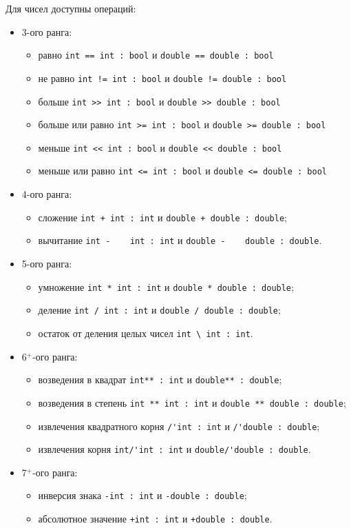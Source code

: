 \documentclass[a4paper, 14pt]{extarticle}
\newenvironment{icItems}
	{ \begin{itemize} [noitemsep,nolistsep] }
	{ \end{itemize} }
\begin{document}
Для чисел доступны операций:
\begin{icItems}
	\item
		3-ого ранга:
		\begin{icItems}
			\item
				равно \lstinline`int == int : bool` и \lstinline`double == double : bool`
			\item
				не равно \lstinline`int != int : bool` и \lstinline`double != double : bool`
			\item
				больше \lstinline`int >> int : bool` и \lstinline`double >> double : bool`
			\item
				больше или равно \lstinline`int >= int : bool` и \lstinline`double >= double : bool`
			\item
				меньше \lstinline`int << int : bool` и \lstinline`double << double : bool`
			\item
				меньше или равно \lstinline`int <= int : bool` и \lstinline`double <= double : bool`
		\end{icItems}
	\item
		4-ого ранга:
		\begin{icItems}
			\item
				сложение \lstinline`int + int : int` и \lstinline`double + double : double`;
			\item
				вычитание \lstinline`int -    int : int` и \lstinline`double -    double : double`.
		\end{icItems}
	\item
		5-ого ранга:
		\begin{icItems}
			\item
				умножение \lstinline`int * int : int` и \lstinline`double * double : double`;
			\item
				деление \lstinline`int / int : int` и \lstinline`double / double : double`;
			\item
				остаток от деления целых чисел \lstinline`int \ int : int`.
		\end{icItems}
	\item
		6$^+$-ого ранга:
		\begin{icItems}
			\item
				возведения в квадрат \lstinline`int** : int` и \lstinline`double** : double`;
			\item
				возведения в степень \lstinline`int ** int : int` и \lstinline`double ** double : double`;
			\item
				извлечения квадратного корня \lstinline`/'int : int` и \lstinline`/'double : double`;
			\item
				извлечения корня \lstinline`int/'int : int` и \lstinline`double/'double : double`.
		\end{icItems}
	\item
		7$^+$-ого ранга:
		\begin{icItems}
			\item
				инверсия знака \lstinline`-int : int` и \lstinline`-double : double`;
			\item
				абсолютное значение \lstinline`+int : int` и \lstinline`+double : double`.
		\end{icItems}
\end{icItems}
\end{document}
